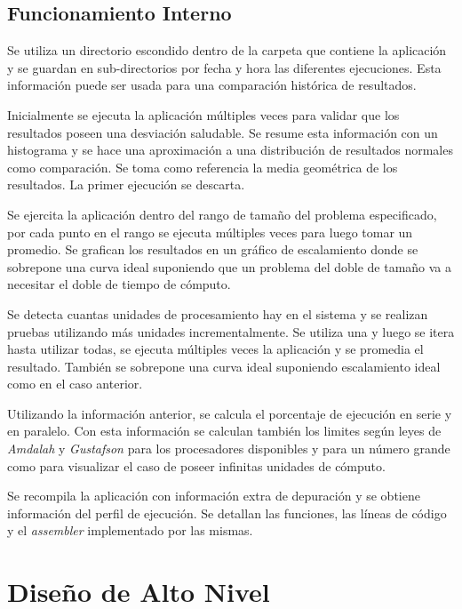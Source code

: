 \documentclass[a4paper]{report}
\begin{document}
\subsection{Funcionamiento Interno}

Se utiliza un directorio escondido dentro de la carpeta que contiene la aplicación y se guardan en sub-directorios por fecha y hora las diferentes ejecuciones. 
Esta información puede ser usada para una comparación histórica de resultados.

\bigskip

Inicialmente se ejecuta la aplicación múltiples veces para validar que los resultados poseen una desviación saludable. Se resume esta información con un histograma y se hace una aproximación
a una distribución de resultados normales como comparación. Se toma como referencia la media geométrica de los resultados. La primer ejecución se descarta.

\bigskip

Se ejercita la aplicación dentro del rango de tamaño del problema especificado, por cada punto en el rango se ejecuta múltiples veces para luego tomar un promedio. Se grafican los resultados
en un gráfico de escalamiento donde se sobrepone una curva ideal suponiendo que un problema del doble de tamaño va a necesitar el doble de tiempo de cómputo.

\bigskip

Se detecta cuantas unidades de procesamiento hay en el sistema y se realizan pruebas utilizando más unidades incrementalmente. Se utiliza una y luego se itera hasta utilizar todas,
se ejecuta múltiples veces la aplicación y se promedia el resultado. También se sobrepone una curva ideal suponiendo escalamiento ideal como en el caso anterior.

\bigskip

Utilizando la información anterior, se calcula el porcentaje de ejecución en serie y en paralelo. Con esta información se calculan también los limites según leyes de {\it Amdalah} y
{\it Gustafson} para los procesadores disponibles y para un número grande como para visualizar el caso de poseer infinitas unidades de cómputo.

\bigskip

Se recompila la aplicación con información extra de depuración y se obtiene información del perfil de ejecución. Se detallan las funciones, las líneas de código y el
{\it assembler} implementado por las mismas.

\section{Diseño de Alto Nivel}
\end{document}
